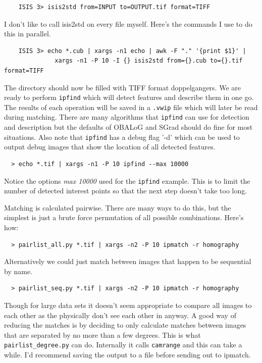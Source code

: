\begin{verbatim}
    ISIS 3> isis2std from=INPUT to=OUTPUT.tif format=TIFF
\end{verbatim}

I don't like to call isis2std on every file myself. Here's the
commands I use to do this in parallel.

\begin{verbatim}
    ISIS 3> echo *.cub | xargs -n1 echo | awk -F "." '{print $1}' |
              xargs -n1 -P 10 -I {} isis2std from={}.cub to={}.tif format=TIFF
\end{verbatim}

The directory should now be filled with TIFF format doppelgangers. We
are ready to perform \texttt{ipfind} which will detect features and
describe them in one go. The results of each operation will be saved
in a \texttt{.vwip} file which will later be read during
matching. There are many algorithms that \texttt{ipfind} can use for
detection and description but the defaults of OBALoG and SGrad should
do fine for most situations. Also note that \texttt{ipfind} has a
debug flag '-d' which can be used to output debug images that show the
location of all detected features.

\begin{verbatim}
  > echo *.tif | xargs -n1 -P 10 ipfind --max 10000
\end{verbatim}

Notice the options \emph{\-\-max 10000} used for the \texttt{ipfind}
example. This is to limit the number of detected interest points so
that the next step doesn't take too long.

Matching is calculated pairwise. There are many ways to do this, but
the simplest is just a brute force permutation of all possible
combinations. Here's how:

\begin{verbatim}
  > pairlist_all.py *.tif | xargs -n2 -P 10 ipmatch -r homography
\end{verbatim}

Alternatively we could just match between images that happen to be
sequential by name.

\begin{verbatim}
  > pairlist_seq.py *.tif | xargs -n2 -P 10 ipmatch -r homography
\end{verbatim}

Though for large data sets it doesn't seem appropriate to compare all
images to each other as the physically don't see each other in
anyway. A good way of reducing the matches is by deciding to only
calculate matches between images that are separated by no more than a
few degrees. This is what \texttt{pairlist\_degree.py} can
do. Internally it calls \texttt{camrange} and this can take a
while. I'd recommend saving the output to a file before sending out to
ipmatch.

